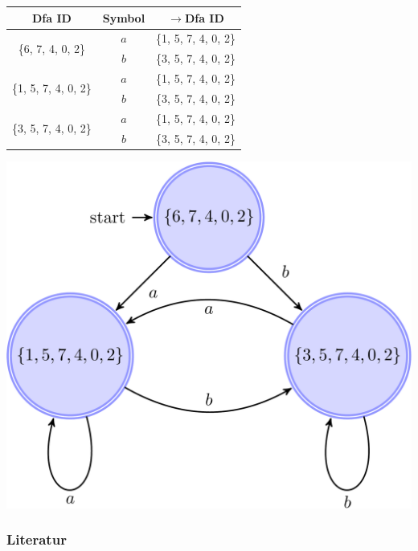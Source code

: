 \documentclass[ignorenonframetext]{beamer}
\begin{document}
\begin{frame}[plain]

\begin{center}
    \begin{tabular}{c|c|c}
        Dfa ID & Symbol & $\rightarrow$Dfa ID\\
        \hline
        \multirow{2}{*}{\{6, 7, 4, 0, 2\}}   & $a$ & \{1, 5, 7, 4, 0, 2\} \\
                            & $b$ & \{3, 5, 7, 4, 0, 2\} \\
        \hline
        \multirow{2}{*}{\{1, 5, 7, 4, 0, 2\}} & $a$ & \{1, 5, 7, 4, 0, 2\}\\
                             & $b$ & \{3, 5, 7, 4, 0, 2\}\\
        \hline
         \multirow{2}{*}{\{3, 5, 7, 4, 0, 2\}}& $a$ & \{1, 5, 7, 4, 0, 2\}\\
                             & $b$ &  \{3, 5, 7, 4, 0, 2\}\\
    \end{tabular} 
\end{center}

\begin{center}
    \includegraphics[scale=.175]{aorbstar.pdf}
\end{center}

\end{frame}


\begin{frame}[allowframebreaks]
    \frametitle{Literatur}
    
    
    \nocite{*}
\end{frame}
\end{document}

